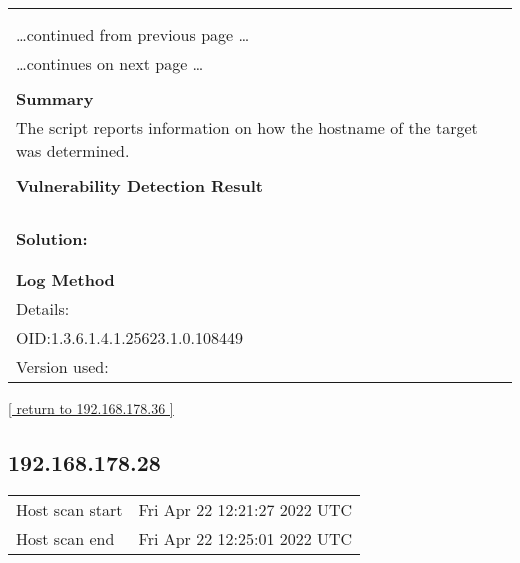 \documentclass{article}
\begin{document}
\begin{longtable}{|p{}|}
\hline
\rowcolor{gvm_log}{\color{white}{Log (CVSS: 0.0) }}\\
\rowcolor{gvm_log}{\color{white}{NVT: Hostname Determination Reporting}}\\
\hline
\endfirsthead
\hfill\ldots continued from previous page \ldots \\
\hline
\endhead
\hline
\ldots continues on next page \ldots \\
\endfoot
\hline
\endlastfoot
\\
\textbf{Summary}\\
The script reports information on how the hostname
  of the target was determined.\\

        \hline
        \\
\textbf{Vulnerability Detection Result}\\
\rowcolor{white}{\verb=Hostname determination for IP 192.168.178.36:=}\\
\rowcolor{white}{\verb=Hostname|Source=}\\
\rowcolor{white}{\verb=iphone-fj.fritz.box|Reverse-DNS=}\\

          \hline
          \\
\textbf{Solution:}\\
\\


        \hline
        \\
\textbf{Log Method}\\
Details:
\rowcolor{white}{\verb=Hostname Determination Reporting=}\\
OID:1.3.6.1.4.1.25623.1.0.108449\\
Version used:
\rowcolor{white}{\verb=2018-11-19T11:11:31Z=}\\
\end{longtable}

\begin{footnotesize}\hyperref[host:192.168.178.36]{[ return to 192.168.178.36 ]}\end{footnotesize}
\subsection{192.168.178.28}
\label{host:192.168.178.28}

\begin{tabular}{ll}
Host scan start&Fri Apr 22 12:21:27 2022 UTC\\
Host scan end&Fri Apr 22 12:25:01 2022 UTC\\
\end{tabular}
\end{document}
